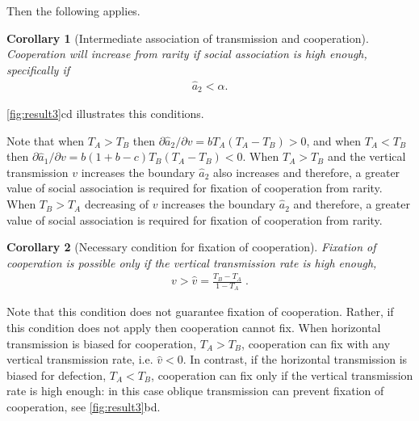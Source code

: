 \documentclass[12pt]{extarticle}
\newtheorem{corollary}{Corollary}
\begin{document}
{Then the following applies.
\\

\begin{corollary}[Intermediate association of transmission and cooperation]
\label{corollary:intermediate_association_res3}
Cooperation will increase from rarity if social association is high enough, specifically if
  \begin{equation} \label{eq:unequal_transmission_from_rarity_in_alpha_terms}
    \begin{aligned}
     \hat a_2 < \alpha.
    \end{aligned}
    \end{equation} 
\end{corollary}
\autoref{fig:result3}cd illustrates this conditions.

Note that when $T_A>T_B$ then $\partial \hat a_2 / \partial v = b T_A (T_A-T_B) > 0$, and when $T_A<T_B$ then $\partial \hat a_1 / \partial v = b(1+b-c)T_B(T_A-T_B) < 0$. When $T_A>T_B$ and the vertical transmission $v$ increases the boundary $\hat{a}_2$ also increases
and therefore, a greater value of social association is required for fixation of cooperation from rarity. When $T_B>T_A$ decreasing of $v$ increases the boundary $\hat{a}_2$ 
and therefore, a greater value of social association is required for fixation of cooperation from rarity.
\\

\begin{corollary}[Necessary condition for fixation of cooperation]
\label{corollary:vhat}
  Fixation of cooperation is possible only if the vertical transmission rate is high enough,
  \begin{equation} \label{eq:fixation_of_cooperation_vertical_transmission_condition}
    \begin{aligned}
      v>\hat{v} = \frac{T_B - T_A}{1-T_A} \;.
    \end{aligned}
    \end{equation} 
\end{corollary}
Note that this condition does not guarantee fixation of cooperation. Rather, if this condition does not apply then cooperation cannot fix.
When horizontal transmission is biased for cooperation, $T_A>T_B$, cooperation can fix with any vertical transmission rate, i.e. $\hat{v}<0$.
In contrast, if the horizontal transmission is biased for defection, $T_A<T_B$,  cooperation can fix only if the vertical transmission rate is high enough: in this case oblique transmission can prevent fixation of cooperation, see \autoref{fig:result3}bd.
\\


}
\end{document}
